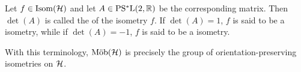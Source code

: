 \begin{definition}
	Let $f \in \mathrm{Isom}(\mathcal{H})$ and let $A \in \mathrm{PS^*L}(2,\mathbb{R})$ be the corresponding matrix. Then $\det(A)$ is called the  of the isometry $f$. If $\det(A) = 1$, $f$ is said to be a  isometry, while if $\det(A) = -1$, $f$ is said to be a  isometry.
\end{definition}

\begin{remark}
	With this terminology, $\mathrm{M\ddot{o}b}(\mathcal{H})$ is precisely the group of orientation-preserving isometries on $\mathcal{H}$.
\end{remark}

\printbibliography


